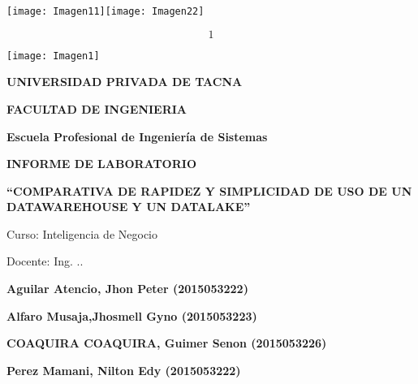 \documentclass{article} %
\begin{document}


\noindent 

\noindent 

\noindent 

\noindent 

\noindent \texttt{[image: Imagen11]}\texttt{[image: Imagen22]}\textbf{ }

\noindent 

\noindent 
\[1\] 


\noindent \texttt{[image: Imagen1]}\textbf{\underbar{}}

\noindent \textbf{}

\noindent \textbf{UNIVERSIDAD PRIVADA DE TACNA}

\noindent \textbf{}

\noindent \textbf{FACULTAD DE INGENIERIA}

\noindent \textbf{\textit{}}

\noindent \textbf{\textit{}}

\noindent \textbf{Escuela Profesional de Ingenier\'{i}a de Sistemas}

\noindent \textbf{}

\noindent 

\noindent \textbf{ INFORME DE LABORATORIO}

\noindent \textbf{``COMPARATIVA DE RAPIDEZ Y SIMPLICIDAD DE USO DE UN DATAWAREHOUSE Y UN DATALAKE''}

\noindent \textbf{}

\noindent Curso: Inteligencia de Negocio

\noindent \textbf{\textit{}}

\noindent \textbf{}

\noindent \textbf{}

\noindent Docente: Ing. ..

\noindent \textbf{}

\noindent \textbf{Aguilar Atencio, Jhon Peter (2015053222)}

\noindent \textbf{Alfaro Musaja,Jhosmell Gyno (2015053223)}

\noindent \textbf{COAQUIRA COAQUIRA, Guimer Senon (2015053226)}

\noindent \textbf{Perez Mamani, Nilton Edy (2015053222)}

\noindent \textbf{}
\end{document}
